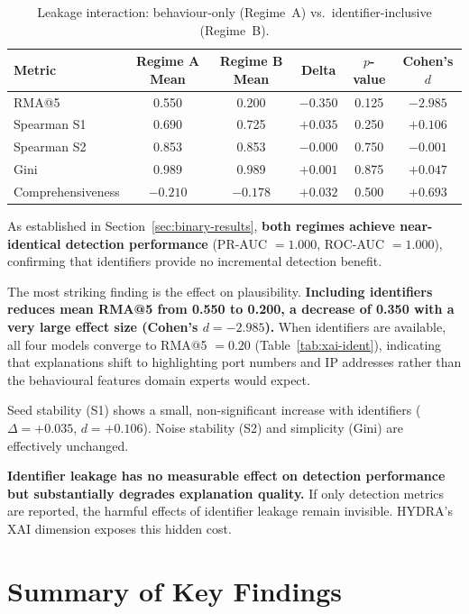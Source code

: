 \documentclass[12pt,a4paper]{report}
\begin{document}
\begin{table}[H]
\centering
\caption{Leakage interaction: behaviour-only (Regime~A) vs.\ identifier-inclusive (Regime~B).}
\label{tab:leakage}
\begin{tabular}{lccccc}
\toprule
\textbf{Metric} & \textbf{Regime A Mean} & \textbf{Regime B Mean} & \textbf{Delta} & \textbf{$p$-value} & \textbf{Cohen's $d$} \\
\midrule
RMA@5 & 0.550 & 0.200 & $-0.350$ & 0.125 & $-2.985$ \\
Spearman S1 & 0.690 & 0.725 & $+0.035$ & 0.250 & $+0.106$ \\
Spearman S2 & 0.853 & 0.853 & $-0.000$ & 0.750 & $-0.001$ \\
Gini & 0.989 & 0.989 & $+0.001$ & 0.875 & $+0.047$ \\
Comprehensiveness & $-0.210$ & $-0.178$ & $+0.032$ & 0.500 & $+0.693$ \\
\bottomrule
\end{tabular}
\end{table}

As established in Section~\ref{sec:binary-results}, \textbf{both regimes achieve near-identical detection performance} (PR-AUC $= 1.000$, ROC-AUC $= 1.000$), confirming that identifiers provide no incremental detection benefit.

The most striking finding is the effect on plausibility. \textbf{Including identifiers reduces mean RMA@5 from 0.550 to 0.200, a decrease of 0.350 with a very large effect size (Cohen's $d = -2.985$).} When identifiers are available, all four models converge to RMA@5 $= 0.20$ (Table~\ref{tab:xai-ident}), indicating that explanations shift to highlighting port numbers and IP addresses rather than the behavioural features domain experts would expect.

Seed stability (S1) shows a small, non-significant increase with identifiers ($\Delta = +0.035$, $d = +0.106$). Noise stability (S2) and simplicity (Gini) are effectively unchanged.

\textbf{Identifier leakage has no measurable effect on detection performance but substantially degrades explanation quality.} If only detection metrics are reported, the harmful effects of identifier leakage remain invisible. HYDRA's XAI dimension exposes this hidden cost.

\section{Summary of Key Findings}
\label{sec:results-summary}
\end{document}
